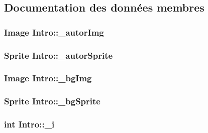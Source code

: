 \subsection{Documentation des données membres}
\hypertarget{classIntro_a6795711abfaaeb4dd292553c7b92722c}{
\subsubsection[{\_\-autorImg}]{\setlength{\rightskip}{0pt plus 5cm}Image {\bf Intro::\_\-autorImg}}}
\label{classIntro_a6795711abfaaeb4dd292553c7b92722c}
\hypertarget{classIntro_a342c936948e27a330214faf21d2de6a3}{
\subsubsection[{\_\-autorSprite}]{\setlength{\rightskip}{0pt plus 5cm}Sprite {\bf Intro::\_\-autorSprite}}}
\label{classIntro_a342c936948e27a330214faf21d2de6a3}
\hypertarget{classIntro_a9bc7b99bb30e25f23ed0edfbec0aab2c}{
\subsubsection[{\_\-bgImg}]{\setlength{\rightskip}{0pt plus 5cm}Image {\bf Intro::\_\-bgImg}}}
\label{classIntro_a9bc7b99bb30e25f23ed0edfbec0aab2c}
\hypertarget{classIntro_a82f0f85c29f0b8e18b5c9aefd49ac495}{
\subsubsection[{\_\-bgSprite}]{\setlength{\rightskip}{0pt plus 5cm}Sprite {\bf Intro::\_\-bgSprite}}}
\label{classIntro_a82f0f85c29f0b8e18b5c9aefd49ac495}
\hypertarget{classIntro_a0e13edf1262e2d47720214b44a80894f}{
\subsubsection[{\_\-i}]{\setlength{\rightskip}{0pt plus 5cm}int {\bf Intro::\_\-i}}}
